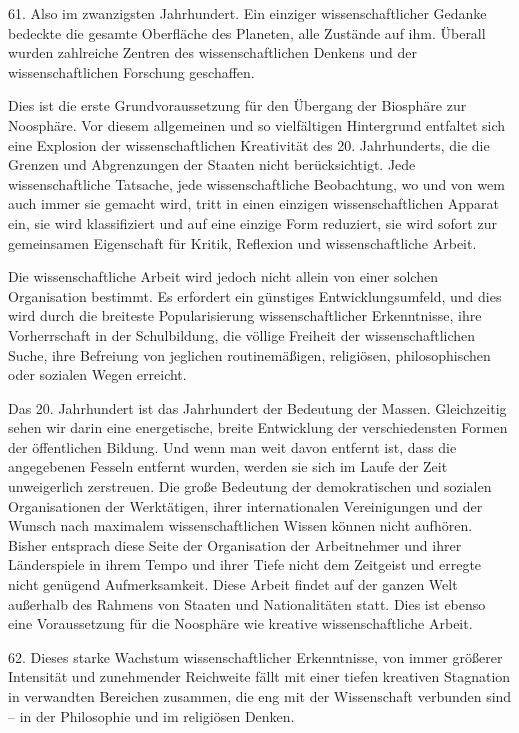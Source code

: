 \documentclass[11pt,a4paper]{book}
\begin{document}
61. Also im zwanzigsten Jahrhundert. Ein einziger wissenschaftlicher Gedanke bedeckte die gesamte Oberfläche des Planeten, alle Zustände auf ihm. Überall wurden zahlreiche Zentren des wissenschaftlichen Denkens und der wissenschaftlichen Forschung geschaffen.



Dies ist die erste Grundvoraussetzung für den Übergang der Biosphäre zur Noosphäre. Vor diesem allgemeinen und so vielfältigen Hintergrund entfaltet sich eine Explosion der wissenschaftlichen Kreativität des 20. Jahrhunderts, die die Grenzen und Abgrenzungen der Staaten nicht berücksichtigt. Jede wissenschaftliche Tatsache, jede wissenschaftliche Beobachtung, wo und von wem auch immer sie gemacht wird, tritt in einen einzigen wissenschaftlichen Apparat ein, sie wird klassifiziert und auf eine einzige Form reduziert, sie wird sofort zur gemeinsamen Eigenschaft für Kritik, Reflexion und wissenschaftliche Arbeit.



Die wissenschaftliche Arbeit wird jedoch nicht allein von einer solchen Organisation bestimmt. Es erfordert ein günstiges Entwicklungsumfeld, und dies wird durch die breiteste Popularisierung wissenschaftlicher Erkenntnisse, ihre Vorherrschaft in der Schulbildung, die völlige Freiheit der wissenschaftlichen Suche, ihre Befreiung von jeglichen routinemäßigen, religiösen, philosophischen oder sozialen Wegen erreicht.



Das 20. Jahrhundert ist das Jahrhundert der Bedeutung der Massen. Gleichzeitig sehen wir darin eine energetische, breite Entwicklung der verschiedensten Formen der öffentlichen Bildung. Und wenn man weit davon entfernt ist, dass die angegebenen Fesseln entfernt wurden, werden sie sich im Laufe der Zeit unweigerlich zerstreuen. Die große Bedeutung der demokratischen und sozialen Organisationen der Werktätigen, ihrer internationalen Vereinigungen und der Wunsch nach maximalem wissenschaftlichen Wissen können nicht aufhören. Bisher entsprach diese Seite der Organisation der Arbeitnehmer und ihrer Länderspiele in ihrem Tempo und ihrer Tiefe nicht dem Zeitgeist und erregte nicht genügend Aufmerksamkeit. Diese Arbeit findet auf der ganzen Welt außerhalb des Rahmens von Staaten und Nationalitäten statt. Dies ist ebenso eine Voraussetzung für die Noosphäre wie kreative wissenschaftliche Arbeit.



62. Dieses starke Wachstum wissenschaftlicher Erkenntnisse, von immer größerer Intensität und zunehmender Reichweite fällt mit einer tiefen kreativen Stagnation in verwandten Bereichen zusammen, die eng mit der Wissenschaft verbunden sind -- in der Philosophie und im religiösen Denken.
\end{document}
